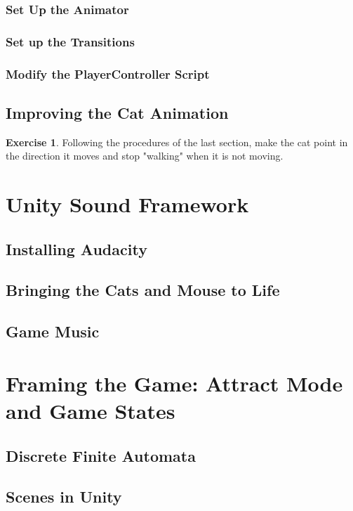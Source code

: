 \documentclass[12pt]{amsbook}
\theoremstyle{definition}
\newtheorem{exercise}{Exercise}[chapter]
\theoremstyle{remark}
\numberwithin{figure}{chapter}
\numberwithin{table}{chapter}
\numberwithin{section}{chapter}
\numberwithin{equation}{section}
\begin{document}
\subsection{Set Up the Animator}

\subsection{Set up the Transitions}


\subsection{Modify the PlayerController Script}


\section{Improving the Cat Animation}
\begin{exercise}
Following the procedures of the last section, make the cat point in the direction it moves and stop "walking" when it is not moving.
\end{exercise}

\chapter{Unity Sound Framework}


\section{Installing Audacity}

\section{Bringing the Cats and Mouse to Life}
\section{Game Music}


\chapter[Framing the Game]{Framing the Game: Attract Mode and Game States}
\section{Discrete Finite Automata}
\cite{CSRL01}

\section{Scenes in Unity}
\end{document}
